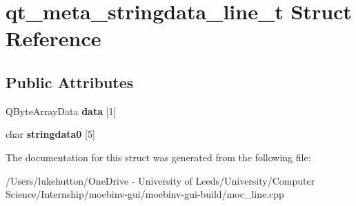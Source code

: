 \hypertarget{structqt__meta__stringdata__line__t}{}\section{qt\+\_\+meta\+\_\+stringdata\+\_\+line\+\_\+t Struct Reference}
\label{structqt__meta__stringdata__line__t}
\subsection*{Public Attributes}
\begin{DoxyCompactItemize}
\item 
\mbox{\label{structqt__meta__stringdata__line__t_a376e9f05a08dbff18309be70ba87c807}} 
Q\+Byte\+Array\+Data {\bfseries data} \mbox{[}1\mbox{]}
\item 
\mbox{\label{structqt__meta__stringdata__line__t_aafcc21a193589e9460b20da78a228294}} 
char {\bfseries stringdata0} \mbox{[}5\mbox{]}
\end{DoxyCompactItemize}


The documentation for this struct was generated from the following file\+:\begin{DoxyCompactItemize}
\item 
/\+Users/lukehutton/\+One\+Drive -\/ University of Leeds/\+University/\+Computer Science/\+Internship/moebinv-\/gui/moebinv-\/gui-\/build/moc\+\_\+line.\+cpp\end{DoxyCompactItemize}
